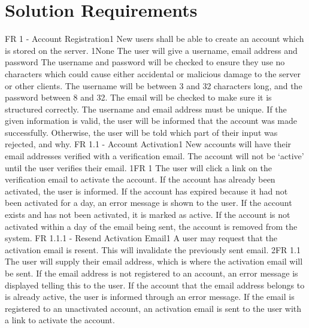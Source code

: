 \section{Solution Requirements}
	\solreq
		{FR 1 - Account Registration}{1}
		{New users shall be able to create an account which is stored on the server.}
		{1}{None}
		{The user will give a username, email address and password}
		{The username and password will be checked to ensure they use no characters which could cause either accidental or malicious damage to the server or other clients. The username will be between 3 and 32 characters long, and the password between 8 and 32. The email will be checked to make sure it is structured correctly. The username and email address must be unique.}
		{If the given information is valid, the user will be informed that the account was made successfully. Otherwise, the user will be told which part of their input was rejected, and why.}
	\solreq
		{FR 1.1 - Account Activation}{1}
		{New accounts will have their email addresses verified with a verification email. The account will not be `active' until the user verifies their email.}
		{1}{FR 1}
		{The user will click a link on the verification email to activate the account.}
		{If the account has already been activated, the user is informed. If the account has expired because it had not been activated for a day, an error message is shown to the user.}
		{If the account exists and has not been activated, it is marked as active. If the account is not activated within a day of the email being sent, the account is removed from the system.}
	\solreq
		{FR 1.1.1 - Resend Activation Email}{1}
		{A user may request that the activation email is resent. This will invalidate the previously sent email.}
		{2}{FR 1.1}
		{The user will supply their email address, which is where the activation email will be sent.}
		{If the email address is not registered to an account, an error message is displayed telling this to the user. If the account that the email address belongs to is already active, the user is informed through an error message.}
		{If the email is registered to an unactivated account, an activation email is sent to the user with a link to activate the account.}
	
\renewcommand{\arraystretch}{1}
